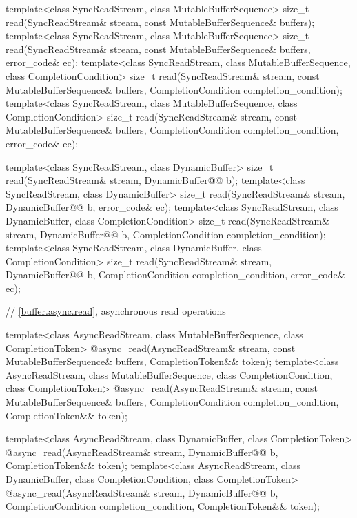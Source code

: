 \begin{codeblock}
{  template<class SyncReadStream, class MutableBufferSequence>
    size_t read(SyncReadStream& stream,
                const MutableBufferSequence& buffers);
  template<class SyncReadStream, class MutableBufferSequence>
    size_t read(SyncReadStream& stream,
                const MutableBufferSequence& buffers, error_code& ec);
  template<class SyncReadStream, class MutableBufferSequence,
    class CompletionCondition>
      size_t read(SyncReadStream& stream,
                  const MutableBufferSequence& buffers,
                  CompletionCondition completion_condition);
  template<class SyncReadStream, class MutableBufferSequence,
    class CompletionCondition>
      size_t read(SyncReadStream& stream,
                  const MutableBufferSequence& buffers,
                  CompletionCondition completion_condition,
                  error_code& ec);

  template<class SyncReadStream, class DynamicBuffer>
    size_t read(SyncReadStream& stream, DynamicBuffer@\removedcode{\&\&}@ b);
  template<class SyncReadStream, class DynamicBuffer>
    size_t read(SyncReadStream& stream, DynamicBuffer@\removedcode{\&\&}@ b, error_code& ec);
  template<class SyncReadStream, class DynamicBuffer, class CompletionCondition>
    size_t read(SyncReadStream& stream, DynamicBuffer@\removedcode{\&\&}@ b,
                CompletionCondition completion_condition);
  template<class SyncReadStream, class DynamicBuffer, class CompletionCondition>
    size_t read(SyncReadStream& stream, DynamicBuffer@\removedcode{\&\&}@ b,
                CompletionCondition completion_condition, error_code& ec);

  // \ref{buffer.async.read}, asynchronous read operations

  template<class AsyncReadStream, class MutableBufferSequence,
    class CompletionToken>
      @\DEDUCED@ async_read(AsyncReadStream& stream,
                         const MutableBufferSequence& buffers,
                         CompletionToken&& token);
  template<class AsyncReadStream, class MutableBufferSequence,
    class CompletionCondition, class CompletionToken>
      @\DEDUCED@ async_read(AsyncReadStream& stream,
                         const MutableBufferSequence& buffers,
                         CompletionCondition completion_condition,
                         CompletionToken&& token);

  template<class AsyncReadStream, class DynamicBuffer, class CompletionToken>
    @\DEDUCED@ async_read(AsyncReadStream& stream,
                       DynamicBuffer@\removedcode{\&\&}@ b, CompletionToken&& token);
  template<class AsyncReadStream, class DynamicBuffer,
    class CompletionCondition, class CompletionToken>
      @\DEDUCED@ async_read(AsyncReadStream& stream,
                         DynamicBuffer@\removedcode{\&\&}@ b,
                         CompletionCondition completion_condition,
                         CompletionToken&& token);

}
\end{codeblock}
